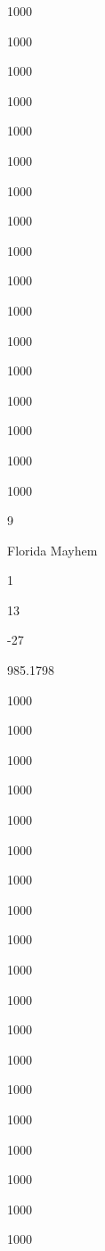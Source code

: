 \documentclass[]{article}
\begin{document}
1000

1000

1000

1000

1000

1000

1000

1000

1000

1000

1000

1000

1000

1000

1000

1000

1000

9

Florida Mayhem

1

13

{-27}

{985.1798}

1000

1000

1000

1000

1000

1000

1000

1000

1000

1000

1000

1000

1000

1000

1000

1000

1000

1000

1000
\end{document}
